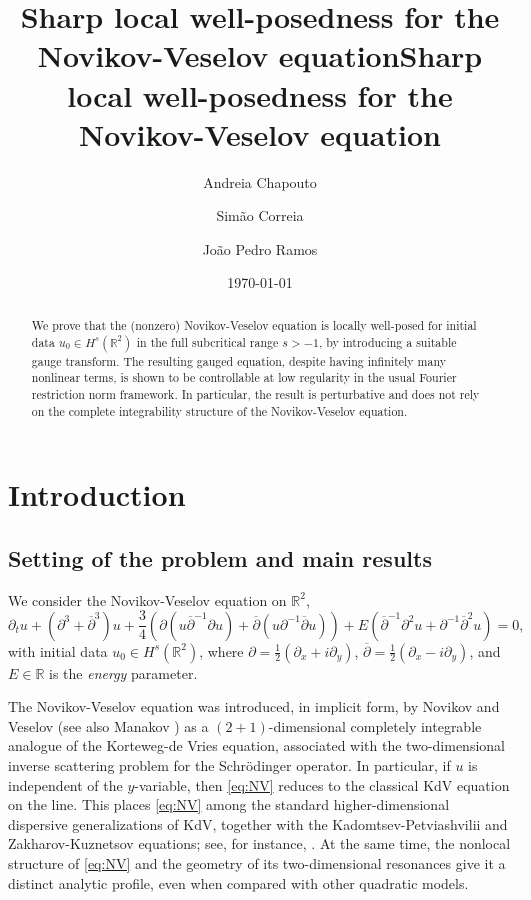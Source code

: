 \documentclass[a4paper,
11pt,  reqno]{amsart}
\title{Sharp local well-posedness for the Novikov-Veselov equation}
\title[Sharp LWP for the Novikov-Veselov equation]{Sharp local well-posedness for the Novikov-Veselov equation}
\author[A.~Chapouto \and S.~Correia \and J.~P.~Ramos]
{Andreia Chapouto \and Sim\~ao Correia \and Jo\~ao Pedro Ramos}
\date{\today}
\newcommand{\5}{\textup{V}}
\newcommand{\dx}{\partial_x}
\theoremstyle{remark}
\newcommand{\R}{\mathbb{R}}
\numberwithin{equation}{section}
\numberwithin{theorem}{section}
\begin{document}
\maketitle
\begin{abstract}
	We prove that the (nonzero) Novikov-Veselov equation is locally well-posed for initial data $u_0\in H^s(\R^2)$ in the full subcritical range $s>-1$, by introducing a suitable gauge transform. The resulting gauged equation, despite having infinitely many nonlinear terms, is shown to be controllable at low regularity in the usual Fourier restriction norm framework. In particular, the result is perturbative and does not rely on the complete integrability structure of the Novikov-Veselov equation.
\end{abstract}

\section{Introduction}
\subsection{Setting of the problem and main results}
We consider the Novikov-Veselov equation on $\R^2$,
\begin{equation}\tag{NV}\label{eq:NV}
	\partial_t u + (\partial^3 + \overline{\partial}^3)u + \frac34(\partial(u\overline{\partial}^{-1}\partial u) + \overline{\partial}(u\partial^{-1}\overline{\partial}u)) + E(\overline{\partial}^{-1}\partial^2 u + \partial^{-1}\overline{\partial}^2 u)=0,
\end{equation}
with initial data $u_0\in H^s(\R^2)$, where $\partial=\frac12(\partial_x+i\partial_y)$,
$\overline{\partial}=\frac12(\dx-i\partial_y)$, and $E\in \R$ is the
\emph{energy} parameter.

\medskip

The Novikov-Veselov equation was introduced, in implicit form, by Novikov and Veselov \cite{NovikovVeselov} (see also Manakov
\cite{Manakov}) as a
$(2+1)$-dimensional completely integrable analogue of the Korteweg-de Vries equation, associated with the
two-dimensional inverse scattering problem for the Schr\"odinger operator. In particular,
if $u$ is independent of the $y$-variable, then \eqref{eq:NV} reduces to the classical KdV
equation on the line. This places \eqref{eq:NV} among the standard higher-dimensional
dispersive generalizations of KdV, together with the Kadomtsev-Petviashvilii and
Zakharov-Kuznetsov equations; see, for instance,
\cite{bourg_kpii, takaokaTzvetkov, HHK, IonescuKenigTataru, GuoPengWang,
Kinoshita_ZK}. At the same time, the nonlocal structure of \eqref{eq:NV} and the geometry
of its two-dimensional resonances give it a distinct analytic profile, even when compared
with other quadratic models.
\end{document}
